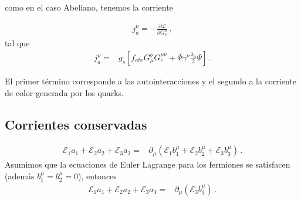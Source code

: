 como en el caso Abeliano, tenemos la corriente
\begin{frame}
\begin{align}
  \label{eq:noabeljnu}
j^{\nu}_{a}=-\frac{\partial\mathcal{L}}{\partial G_\nu^a}\,,
\end{align}
tal que
\begin{align}
\label{eq:jnuqcd}
  j^\nu_a=&g_s\left[f_{abc}G^b_\mu G^{\mu\nu}_c+\bar{\Psi}\gamma^\nu\frac{\lambda_a}{2}\Psi  \right]\,.
\end{align}

El primer término corresponde a las autointeracciones y el segundo a la corriente de color generada por los quarks.
\end{frame}

\subsection{Corrientes conservadas}

\begin{align}
  \mathcal{E}_1 a_1 + \mathcal{E}_2 a_2 + \mathcal{E}_3 a_3=& \partial_{\mu} \left( \mathcal{E}_1 b_1^{\mu} + \mathcal{E}_2 b_2^{\mu} + \mathcal{E}_3 b_3^{\mu}   \right) \,.
\end{align}
Asumimos que la ecuaciones de Euler Lagrange para los fermiones se satisfacen (además $b_1^{\mu}=b_2^{\mu}=0$), entonces
\begin{align}
   \mathcal{E}_1 a_1 + \mathcal{E}_2 a_2 +  \mathcal{E}_3 a_3=& \partial_{\mu} \left(  \mathcal{E}_3 b_3^{\mu}   \right) \,.
\end{align}

